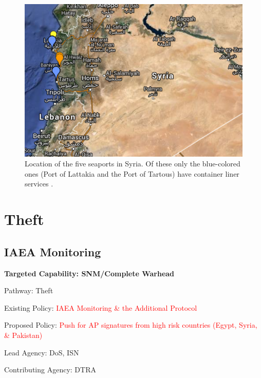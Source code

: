 \documentclass{report}
\begin{document}
\begin{figure}
 \centering
 \includegraphics[trim = 0cm 0cm 0cm 0cm, clip,scale=0.85]{./figures/seaports.png}
   \caption[Location of the five seaports in Syria \cite{WorldPortSource2014}.]{Location of the five seaports in Syria. Of these only the blue-colored ones (Port of Lattakia and the Port of Tartous) have container liner services \cite{WorldPortSource2014}.}
     \label{fig:seaports}
\end{figure}





\section{Theft}


\subsection{IAEA Monitoring}



\bfseries Targeted Capability: SNM/Complete Warhead

Pathway: Theft

Existing Policy:  \textcolor{red}{IAEA Monitoring \& the Additional Protocol}

Proposed Policy:  \textcolor{red}{Push for AP signatures from high risk countries (Egypt, Syria, \& Pakistan)}

Lead Agency: DoS, ISN

Contributing Agency: DTRA \normalfont
\end{document}
